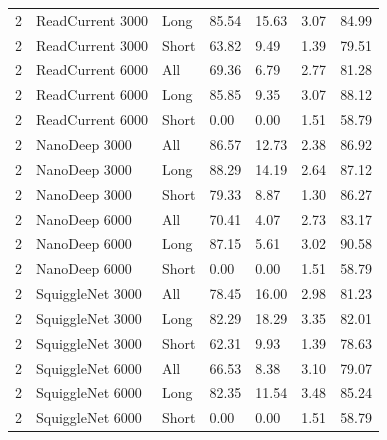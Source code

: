 \begin{longtable}{lllllll}
2 & ReadCurrent 3000 & Long & 85.54 & 15.63 & 3.07 & 84.99\\
2 & ReadCurrent 3000 & Short & 63.82 & 9.49 & 1.39 & 79.51\\
2 & ReadCurrent 6000 & All & 69.36 & 6.79 & 2.77 & 81.28\\
2 & ReadCurrent 6000 & Long & 85.85 & 9.35 & 3.07 & 88.12\\
2 & ReadCurrent 6000 & Short & 0.00 & 0.00 & 1.51 & 58.79\\
2 & NanoDeep 3000 & All & 86.57 & 12.73 & 2.38 & 86.92\\
2 & NanoDeep 3000 & Long & 88.29 & 14.19 & 2.64 & 87.12\\
2 & NanoDeep 3000 & Short & 79.33 & 8.87 & 1.30 & 86.27\\
2 & NanoDeep 6000 & All & 70.41 & 4.07 & 2.73 & 83.17\\
2 & NanoDeep 6000 & Long & 87.15 & 5.61 & 3.02 & 90.58\\
2 & NanoDeep 6000 & Short & 0.00 & 0.00 & 1.51 & 58.79\\
2 & SquiggleNet 3000 & All & 78.45 & 16.00 & 2.98 & 81.23\\
2 & SquiggleNet 3000 & Long & 82.29 & 18.29 & 3.35 & 82.01\\
2 & SquiggleNet 3000 & Short & 62.31 & 9.93 & 1.39 & 78.63\\
2 & SquiggleNet 6000 & All & 66.53 & 8.38 & 3.10 & 79.07\\
2 & SquiggleNet 6000 & Long & 82.35 & 11.54 & 3.48 & 85.24\\
2 & SquiggleNet 6000 & Short & 0.00 & 0.00 & 1.51 & 58.79\\
\end{longtable}
